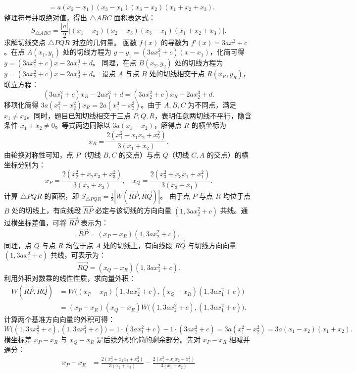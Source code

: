 \begin{solution}
\begin{align*}
&= a(x_2 - x_1)(x_3 - x_1)(x_3 - x_2)(x_1 + x_2 + x_3).
\end{align*}
整理符号并取绝对值，得出 $\triangle ABC$ 面积表达式：
\[ S_{\triangle ABC} = \frac{|a|}{2} \left| (x_1 - x_2)(x_2 - x_3)(x_3 - x_1)(x_1 + x_2 + x_3) \right|. \]
求解切线交点 $\triangle PQR$ 对应的几何量。
函数 $f(x)$ 的导数为 $f'(x) = 3ax^2 + c$。在点 $A(x_1, y_1)$ 处的切线方程为 $y - y_1 = (3ax_1^2 + c)(x - x_1)$，化简可得 $y = (3ax_1^2 + c)x - 2ax_1^3 + d$。
同理，在点 $B(x_2, y_2)$ 处的切线方程为 $y = (3ax_2^2 + c)x - 2ax_2^3 + d$。
设点 $A$ 与点 $B$ 处的切线相交于点 $R(x_R, y_R)$，联立方程：
\[ (3ax_1^2 + c)x_R - 2ax_1^3 + d = (3ax_2^2 + c)x_R - 2ax_2^3 + d. \]
移项化简得 $3a(x_1^2 - x_2^2)x_R = 2a(x_1^3 - x_2^3)$。由于 $A, B, C$ 为不同点，满足 $x_1 \neq x_2$。同时，题目已知切线相交于三点 $P, Q, R$，表明任意两切线不平行，隐含条件 $x_1 + x_2 \neq 0$。等式两边同除以 $3a(x_1 - x_2)$，解得点 $R$ 的横坐标为
\[ x_R = \frac{2(x_1^2 + x_1x_2 + x_2^2)}{3(x_1 + x_2)}. \]
由轮换对称性可知，点 $P$（切线 $B, C$ 的交点）与点 $Q$（切线 $C, A$ 的交点）的横坐标分别为：
\[ x_P = \frac{2(x_2^2 + x_2x_3 + x_3^2)}{3(x_2 + x_3)}, \quad x_Q = \frac{2(x_3^2 + x_3x_1 + x_1^2)}{3(x_3 + x_1)}. \]
计算 $\triangle PQR$ 的面积，即 $S_{\triangle PQR} = \frac{1}{2} \left| W(\overrightarrow{RP}, \overrightarrow{RQ}) \right|$。
由于点 $P$ 与点 $R$ 均位于点 $B$ 处的切线上，有向线段 $\overrightarrow{RP}$ 必定与该切线的方向向量 $(1, 3ax_2^2 + c)$ 共线。通过横坐标差值，可将 $\overrightarrow{RP}$ 表示为：
\[ \overrightarrow{RP} = (x_P - x_R)(1, 3ax_2^2 + c). \]
同理，点 $Q$ 与点 $R$ 均位于点 $A$ 处的切线上，有向线段 $\overrightarrow{RQ}$ 与切线方向向量 $(1, 3ax_1^2 + c)$ 共线，可表示为：
\[ \overrightarrow{RQ} = (x_Q - x_R)(1, 3ax_1^2 + c). \]
利用外积对数乘的线性性质，求向量外积：
\begin{align*}
W(\overrightarrow{RP}, \overrightarrow{RQ}) &= W\big( (x_P - x_R)(1, 3ax_2^2 + c), (x_Q - x_R)(1, 3ax_1^2 + c) \big) \\
&= (x_P - x_R)(x_Q - x_R) W\big( (1, 3ax_2^2 + c), (1, 3ax_1^2 + c) \big).
\end{align*}
计算两个基准方向向量的外积可得：
\[ W\big( (1, 3ax_2^2 + c), (1, 3ax_1^2 + c) \big) = 1 \cdot (3ax_1^2 + c) - 1 \cdot (3ax_2^2 + c) = 3a(x_1^2 - x_2^2) = 3a(x_1 - x_2)(x_1 + x_2). \]
横坐标差 $x_P - x_R$ 与 $x_Q - x_R$ 是后续外积化简的剩余部分。先对 $x_P - x_R$ 相减并通分：
\begin{align*}
x_P - x_R &= \frac{2(x_2^2 + x_2x_3 + x_3^2)}{3(x_2 + x_3)} - \frac{2(x_1^2 + x_1x_2 + x_2^2)}{3(x_1 + x_2)} \\

\end{align*}
\end{solution}
